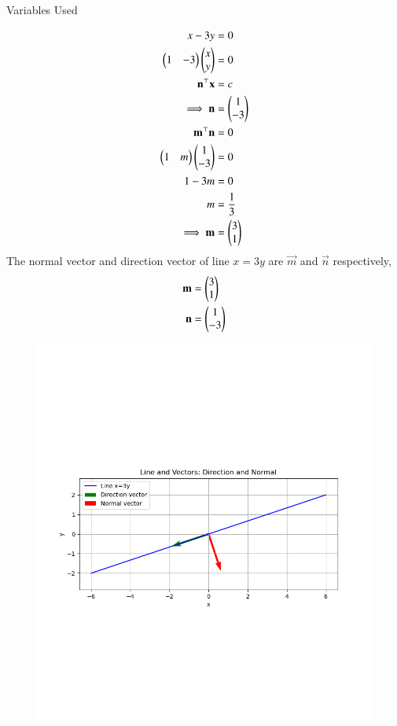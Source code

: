 \documentclass[journal]{IEEEtran}
\begin{document}
\solution
\begin{table}[h!]    
  \centering
  
  \caption{Variables Used}
  \label{tab4.2.10.1}
\end{table}
\begin{align}
    x-3y&=0 \\
    \begin{pmatrix}1 & -3\end{pmatrix}\begin{pmatrix}x \\ y\end{pmatrix}&=0 \\
    \mathbf{n}^\top\mathbf{x}&=c \\
    \implies\mathbf{n}&=\begin{pmatrix}1 \\ -3\end{pmatrix} \\
    \mathbf{m}^\top\mathbf{n}&=0 \\
    \begin{pmatrix}1 & m\end{pmatrix}\begin{pmatrix}1 \\ -3\end{pmatrix}&=0 \\
    1-3m&=0 \\
    m&=\frac{1}{3} \\
    \implies \mathbf{m}&=\begin{pmatrix}3 \\ 1\end{pmatrix}
\end{align}
The normal vector and direction vector of line $x=3y$ are $\vec{m}$ and $\vec{n}$ respectively,
\begin{align}
    \mathbf{m}&=\begin{pmatrix}3 \\ 1\end{pmatrix} \\
    \mathbf{n}&=\begin{pmatrix}1 \\ -3\end{pmatrix}
\end{align}
\begin{figure}[ht!]
	\centering
   	\includegraphics[width=\linewidth]{figs/fig.png}
   	\caption{}
\label{Plot}
\end{figure}
\end{document}
